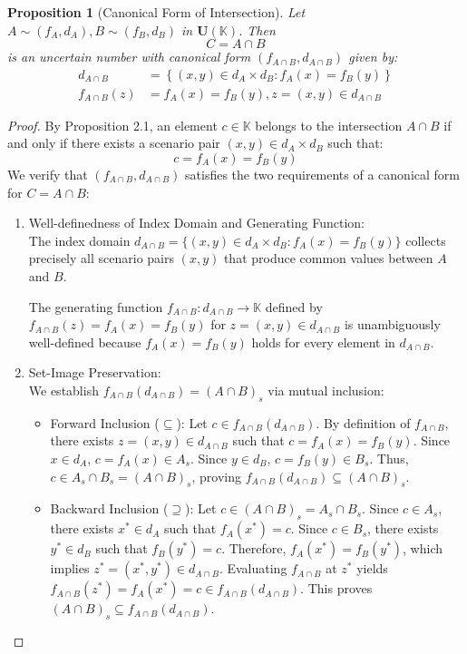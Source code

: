 \documentclass[a4paper,12pt, twoside]{memoir}
\newtheorem{proposition}{Proposition}[chapter]
\newcommand{\set}[1]{\left\{#1\right\}} %
\newcommand{\tsbd}[1]{\mathbf{U}(\mathbb{#1})}
\begin{document}
\begin{proposition}[Canonical Form of Intersection]
	\label{prop:dang_chuan_tac_phep_giao}
	Let $A\sim (f_A,d_A), B \sim (f_B,d_B)$ in $\tsbd{K}$. Then
	\[
		C = A \cap B
	\]
	is an uncertain number with canonical form $(f_{A\cap B},d_{A\cap B})$ given by:
	\begin{align*}
		d_{A\cap B}    & = \set{(x,y) \in d_A \times d_B : f_A(x) = f_B(y)} \\
		f_{A\cap B}(z) & = f_A(x) = f_B(y), z=(x,y) \in d_{A\cap B}
	\end{align*}
\end{proposition}
\begin{proof}
	By Proposition 2.1, an element $c \in \mathbb{K}$ belongs to the intersection $A \cap B$ if and only if there exists a scenario pair $(x, y) \in d_A \times d_B$ such that:
	\[
		c = f_A(x) = f_B(y)
	\]
	We verify that $(f_{A \cap B}, d_{A \cap B})$ satisfies the two requirements of a canonical form for $C = A \cap B$:

	\begin{enumerate}[leftmargin=*]
		\item Well-definedness of Index Domain and Generating Function: \\
		      The index domain $d_{A \cap B} = \{(x, y) \in d_A \times d_B : f_A(x) = f_B(y)\}$ collects precisely all scenario pairs $(x, y)$ that produce common values between $A$ and $B$.

		      The generating function $f_{A \cap B} : d_{A \cap B} \to \mathbb{K}$ defined by $f_{A \cap B}(z) = f_A(x) = f_B(y)$ for $z = (x, y) \in d_{A \cap B}$ is unambiguously well-defined because $f_A(x) = f_B(y)$ holds for every element in $d_{A \cap B}$.

		\item Set-Image Preservation: \\
		      We establish $f_{A \cap B}(d_{A \cap B}) = (A \cap B)_s$ via mutual inclusion:
		      \begin{itemize}[leftmargin=*]
			      \item Forward Inclusion ($\subseteq$):
			            Let $c \in f_{A \cap B}(d_{A \cap B})$. By definition of $f_{A \cap B}$, there exists $z = (x, y) \in d_{A \cap B}$ such that $c = f_A(x) = f_B(y)$.
			            Since $x \in d_A$, $c = f_A(x) \in A_s$. Since $y \in d_B$, $c = f_B(y) \in B_s$.
			            Thus, $c \in A_s \cap B_s = (A \cap B)_s$, proving $f_{A \cap B}(d_{A \cap B}) \subseteq (A \cap B)_s$.

			      \item Backward Inclusion ($\supseteq$):
			            Let $c \in (A \cap B)_s = A_s \cap B_s$.
			            Since $c \in A_s$, there exists $x^* \in d_A$ such that $f_A(x^*) = c$.
			            Since $c \in B_s$, there exists $y^* \in d_B$ such that $f_B(y^*) = c$.
			            Therefore, $f_A(x^*) = f_B(y^*)$, which implies $z^* = (x^*, y^*) \in d_{A \cap B}$.
			            Evaluating $f_{A \cap B}$ at $z^*$ yields $f_{A \cap B}(z^*) = f_A(x^*) = c \in f_{A \cap B}(d_{A \cap B})$.
			            This proves $(A \cap B)_s \subseteq f_{A \cap B}(d_{A \cap B})$.
		      \end{itemize}
	\end{enumerate}


\end{proof}
\end{document}
